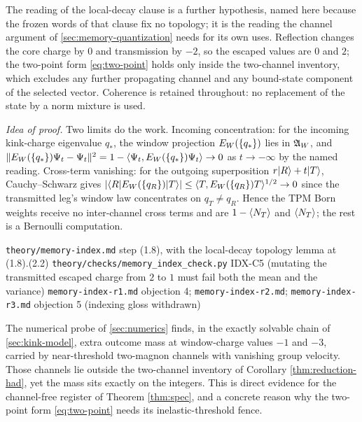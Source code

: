 \begin{scope}
The reading of the local-decay clause is a further hypothesis, named here
because the frozen words of that clause fix no topology; it is the reading
the channel argument of \cref{sec:memory-quantization} needs for its own
uses. Reflection changes the core charge by $0$ and transmission by $-2$, so
the escaped values are $0$ and $2$; the two-point form \eqref{eq:two-point}
holds only inside the two-channel inventory, which excludes any further
propagating channel and any bound-state component of the selected vector.
Coherence is retained throughout: no replacement of the state by a norm
mixture is used.
\end{scope}

\emph{Idea of proof.} Two limits do the work. Incoming concentration: for the
incoming kink-charge eigenvalue $q_*$, the window projection
$E_W(\{q_*\})$ lies in $\mathfrak{A}_W$, and
$\lVert E_W(\{q_*\})\Psi_t-\Psi_t\rVert^{2}
 =1-\langle \Psi_t,E_W(\{q_*\})\Psi_t\rangle\to 0$ as $t\to-\infty$ by the
named reading. Cross-term vanishing: for the outgoing superposition
$r|R\rangle+t|T\rangle$, Cauchy--Schwarz gives
$\lvert \langle R|E_W(\{q_R\})|T\rangle\rvert
 \le \langle T,E_W(\{q_R\})T\rangle^{1/2}\to0$ since the transmitted leg's
window law concentrates on $q_T\neq q_R$. Hence the TPM Born weights receive
no inter-channel cross terms and are $1-\langle N_T\rangle$ and $\langle N_T\rangle$; the
rest is a Bernoulli computation.

{\texttt{theory/memory-index.md} step (1.8), with the local-decay topology
 lemma at (1.8).(2.2)}
{\texttt{theory/checks/memory\_index\_check.py} IDX-C5 (mutating the
 transmitted escaped charge from $2$ to $1$ must fail both the mean and the
 variance)}
{\texttt{memory-index-r1.md} objection 4; \texttt{memory-index-r2.md};
 \texttt{memory-index-r3.md} objection 5 (indexing gloss withdrawn)}

\begin{remark}
\label{ref:probe-fence}
The numerical probe of \cref{sec:numerics} finds, in the exactly solvable
chain of \cref{sec:kink-model}, extra outcome mass at window-charge values
$-1$ and $-3$, carried by near-threshold two-magnon channels with vanishing
group velocity. Those channels lie outside the two-channel inventory of
Corollary \ref{thm:reduction-had}, yet the mass sits exactly on the integers.
This is direct evidence for the channel-free register of Theorem
\ref{thm:spec}, and a concrete reason why the two-point form
\eqref{eq:two-point} needs its inelastic-threshold fence.
\end{remark}

